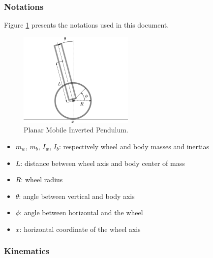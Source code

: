 \documentclass{article}
\begin{document}
\subsubsection{Notations}
Figure \ref{fig: planar_mip} presents the notations used in this document.
\begin{figure}[h]
  \centering
  \includegraphics[width=0.5\textwidth]{images/planar_mip}
  \caption{Planar Mobile Inverted Pendulum.}
  \label{fig: planar_mip}
\end{figure}

\begin{itemize}
\item $m_w$, $m_b$, $I_w$, $I_b$: respectively wheel and body masses and inertias
\item $L$: distance between wheel axis and body center of mass
\item $R$: wheel radius
\item $\theta$: angle between vertical and body axis
\item $\phi$: angle between horizontal and the wheel
\item $x$: horizontal coordinate of the wheel axis
\end{itemize}


\subsubsection{Kinematics}
\end{document}
